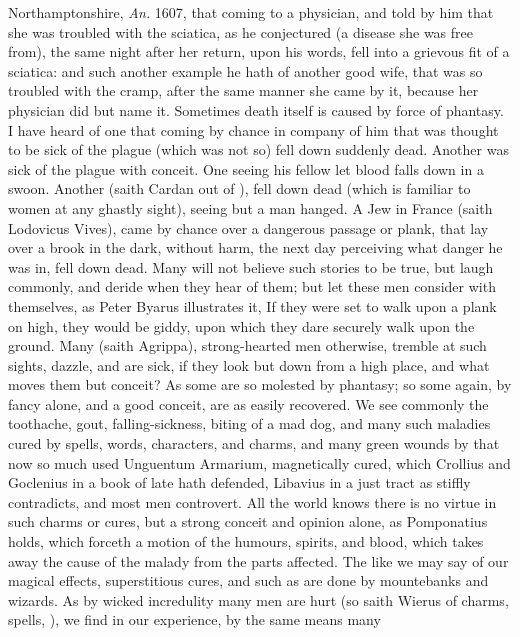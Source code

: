 {Northamptonshire, \emph{An.} 1607, that coming to a physician, and told by
him that she was troubled with the sciatica, as he conjectured (a
disease she was free from), the same night after her return, upon his
words, fell into a grievous fit of a sciatica: and such another example
he hath of another good wife, that was so troubled with the cramp,
after the same manner she came by it, because her physician did but
name it. Sometimes death itself is caused by force of phantasy. I have
heard of one that coming by chance in company of him that was thought
to be sick of the plague (which was not so) fell down suddenly dead.
Another was sick of the plague with conceit. One seeing his fellow let
blood falls down in a swoon. Another (saith Cardan out of
\Aristotle), fell down dead (which is familiar to women at any ghastly
sight), seeing but a man hanged. A Jew in France (saith Lodovicus
Vives), came by chance over a dangerous passage or plank, that lay over
a brook in the dark, without harm, the next day perceiving what danger
he was in, fell down dead. Many will not believe such stories to be
true, but laugh commonly, and deride when they hear of them; but let
these men consider with themselves, as Peter Byarus illustrates
it, If they were set to walk upon a plank on high, they would be giddy,
upon which they dare securely walk upon the ground. Many (saith
Agrippa), strong-hearted men otherwise, tremble at such sights,
dazzle, and are sick, if they look but down from a high place, and what
moves them but conceit? As some are so molested by phantasy; so some
again, by fancy alone, and a good conceit, are as easily recovered. We
see commonly the toothache, gout, falling-sickness, biting of a mad
dog, and many such maladies cured by spells, words, characters, and
charms, and many green wounds by that now so much used Unguentum
Armarium, magnetically cured, which Crollius and Goclenius in a book of
late hath defended, Libavius in a just tract as stiffly contradicts,
and most men controvert. All the world knows there is no virtue in such
charms or cures, but a strong conceit and opinion alone, as
Pomponatius holds, which forceth a motion of the humours,
spirits, and blood, which takes away the cause of the malady from the
parts affected. The like we may say of our magical effects,
superstitious cures, and such as are done by mountebanks and wizards.
As by wicked incredulity many men are hurt (so saith Wierus of
charms, spells, \etc{}), we find in our experience, by the same means many
}
